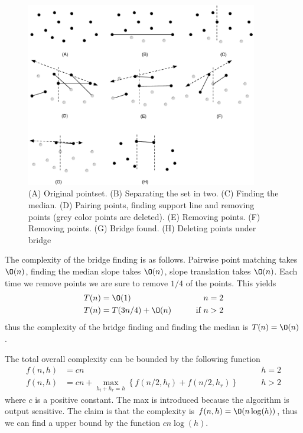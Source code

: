 \documentclass[10pt]{article}
\begin{document}
\begin{figure}[ht]
\centering
\includegraphics[width=0.9\textwidth]{figures/fig19.pdf}
\caption{(A) Original pointset. (B) Separating the set in two. (C) Finding the median. (D) Pairing points, finding support line and removing points (grey color points are deleted). (E) Removing points. (F) Removing points. (G) Bridge found. (H) Deleting points under bridge}
\label{fig19}
\end{figure}

The complexity of the bridge finding is as follows. Pairwise point matching takes $\O(n)$, finding the median slope takes $\O(n)$, slope translation takes $\O(n)$. Each time we remove points we are sure to remove $1/4$ of the points. This yields 
\begin{align*}
T(n) &= \O(1) &\qquad n=2\\ 
T(n) &= T(3n/4) + \O(n) &\qquad \text{if } n>2
\end{align*}
thus the complexity of the bridge finding and finding the median is $T(n)=\O(n)$.

The total overall complexity can be bounded by the following function
\begin{align*}
f(n,h) &= cn &\qquad h=2  \\ 
f(n,h) &= cn + \max_{h_l+h_r = h}\left\{f(n/2,h_l)+f(n/2,h_r)\right\} &\qquad h>2
\end{align*}
where $c$ is a positive constant. The max is introduced because the algorithm is output sensitive. The claim is that the complexity is $f(n,h) = \O(n\log(h))$, thus we can find a upper bound by the function $cn\log(h)$.
\end{document}
